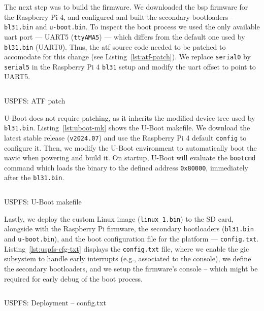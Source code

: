The next step was to build the firmware. We downloaded the \gls{bsp} firmware
for the Raspberry Pi 4, and configured and built the secondary bootloaders --
\texttt{bl31.bin} and \texttt{u-boot.bin}. To inspect the boot process we used
the only available \gls{uart} port --- UART5 (\lstinline{ttyAMA5}) --- which
differs from the default one used by \texttt{bl31.bin} (UART0). Thus, the
\gls{atf} source code needed to be patched to accomodate for this
change (see Listing~\ref{lst:atf-patch}). We replace \lstinline{serial0} by
\lstinline{serial5} in the Raspberry Pi 4 \texttt{bl31} setup and modify the
\gls{uart} offset to point to UART5.

\begin{longlisting}
\centering
\inputminted[]{makefile}{./listing/atf-patch.mk}
\caption{USPFS: ATF patch}
\label{lst:atf-patch}
\end{longlisting}

U-Boot does not require patching, as it inherits the modified device tree used
by \texttt{bl31.bin}. Listing~\ref{lst:uboot-mk} shows the U-Boot makefile. We
download the latest stable release (\lstinline{v2024.07}) and use the Raspberry
Pi 4 default \texttt{config} to configure it. Then, we modify the U-Boot
environment to automatically boot the \gls{uavic} when powering and build it. On startup,
U-Boot will evaluate the \texttt{bootcmd} command which loads the binary to the
defined address \lstinline{0x80000}, immediately after the
\texttt{bl31.bin}.

\begin{longlisting}
\centering
\inputminted[]{makefile}{./listing/uboot.mk}
\caption{USPFS: U-Boot makefile}
\label{lst:uboot-mk}
\end{longlisting}

Lastly, we deploy the custom Linux image (\texttt{linux\_1.bin}) to the SD card,
alongside with the Raspberry Pi firmware, the secondary bootloaders
(\texttt{bl31.bin} and \texttt{u-boot.bin}), and the boot configuration file for
the platform --- \texttt{config.txt}. Listing~\ref{lst:uspfs-cfg-txt} displays
the \texttt{config.txt} file, where we enable the \gls{gic} subsystem to handle
early interrupts (e.g., associated to the console), we define the secondary
bootloaders, and we setup the firmware's console -- which might be required
for early debug of the boot process.

\begin{longlisting}
\centering
\inputminted[]{kconfig}{./listing/config.txt}
\caption{USPFS: Deployment -- config.txt}
\label{lst:uspfs-cfg-txt}
\end{longlisting}

